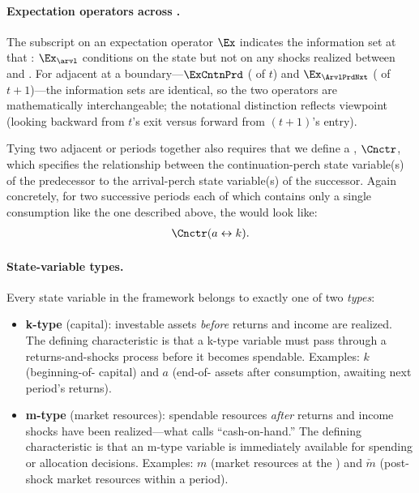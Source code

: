 \documentclass[titlepage, headings=optiontotocandhead]{econark}
\begin{document}
\hypertarget{expectation-operators}{}
\paragraph{Expectation operators across {\prchs}.}  The subscript on an expectation operator $\Ex$ indicates the information set at that {\prch}: $\Ex_{\arvl}$ conditions on the {\Arrival} state but not on any shocks realized between {\Arrival} and {\Decision}.  For adjacent {\prchs} at a {\interval} boundary---$\ExCntnPrd$ ({\Continuation} of {\interval} $t$) and $\Ex_{\ArvlPrdNxt}$ ({\Arrival} of {\interval} $t+1$)---the information sets are identical, so the two operators are mathematically interchangeable; the notational distinction reflects viewpoint (looking backward from $t$'s exit versus forward from $(t+1)$'s entry).

Tying two adjacent {\stgs} or periods together also requires that we define a {\Cnct}, ${\Cnctr}$, which specifies the relationship between the continuation-perch state variable(s) of the predecessor to the arrival-perch state variable(s) of the successor. Again concretely, for two successive periods each of which contains only a single consumption {\stg} like the one described above, the {\Cnct} would look like:
  \begin{equation}\begin{gathered}\begin{aligned} \label{eq:last-stg-v-is-end-prd-v} 
        \Cnctr(a \leftrightarrow k).
      \end{aligned}\end{gathered}\end{equation}

\hypertarget{state-variable-types}{}
\paragraph{State-variable types.}
Every state variable in the framework belongs to exactly one of two
\textit{types}:

\begin{itemize}
  \item \textbf{k-type} (capital): investable assets \textit{before}
    returns and income are realized. The defining characteristic is that
    a k-type variable must pass through a returns-and-shocks process
    before it becomes spendable. Examples: $k$
    (beginning-of-{\interval} capital) and $a$ (end-of-{\interval}
    assets after consumption, awaiting next period's returns).

  \item \textbf{m-type} (market resources): spendable resources
    \textit{after} returns and income shocks have been
    realized---what \citet{deatonUnderstandingC} calls ``cash-on-hand.''
    The defining characteristic is that an m-type variable is immediately
    available for spending or allocation decisions. Examples: $m$
    (market resources at the {\Decision} {\prch}) and $\check{m}$
    (post-shock market resources within a period).
\end{itemize}
\end{document}
